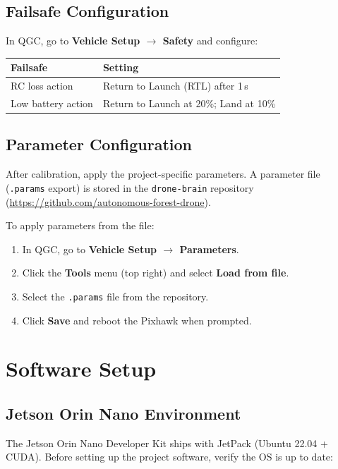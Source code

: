 \documentclass{article}
\begin{document}
\subsection{Failsafe Configuration}

In QGC, go to \textbf{Vehicle Setup $\rightarrow$ Safety} and configure:

\begin{tabular}{ll}
\toprule
\textbf{Failsafe} & \textbf{Setting} \\
\midrule
RC loss action & Return to Launch (RTL) after 1\,s \\
Low battery action & Return to Launch at 20\%; Land at 10\% \\
\bottomrule
\end{tabular}

\subsection{Parameter Configuration}
\label{sec:params}

After calibration, apply the project-specific parameters. A parameter file (\texttt{.params} export) is stored in the \texttt{drone-brain} repository (\url{https://github.com/autonomous-forest-drone}).

To apply parameters from the file:
\begin{enumerate}
    \item In QGC, go to \textbf{Vehicle Setup $\rightarrow$ Parameters}.
    \item Click the \textbf{Tools} menu (top right) and select \textbf{Load from file}.
    \item Select the \texttt{.params} file from the repository.
    \item Click \textbf{Save} and reboot the Pixhawk when prompted.
\end{enumerate}

\section{Software Setup}

\subsection{Jetson Orin Nano Environment}

The Jetson Orin Nano Developer Kit ships with JetPack (Ubuntu 22.04 + CUDA). Before setting up the project software, verify the OS is up to date:
\end{document}
